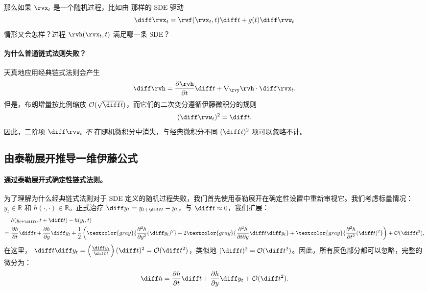 \begin{question}
那么如果 $\rvx_t$ 是一个随机过程，比如由  那样的 SDE 驱动
\[
\diff \rvx_t = \rvf(\rvx_t, t)\diff t + g(t) \diff \rvw_t
\]
情形又会怎样？过程 $\rvh(\rvx_t, t)$ 满足哪一条 SDE？
\end{question}

\paragraph{为什么普通链式法则失败？}
天真地应用经典链式法则会产生
\[
\diff \rvh = \frac{\partial \rvh}{\partial t} \diff t + \nabla_{\rvy}\rvh  \cdot \diff \rvx_t.
\]
但是，布朗增量按比例缩放
$\mathcal{O}(\sqrt{\diff t})$，而它们的二次变分遵循伊藤微积分的规则
\[
(\diff \rvw_t)^2 = \diff t.
\]
因此，二阶项 $\diff \rvw_t$ \textit{不} 在随机微积分中消失，与经典微积分不同 $(\diff t)^2$ 项可以忽略不计。



\subsection{由泰勒展开推导一维伊藤公式}\label{subsec:1D-Ito}

\paragraph{通过泰勒展开式确定性链式法则。}
为了理解为什么经典链式法则对于 SDE 定义的随机过程失败，我们首先使用泰勒展开在确定性设置中重新审视它。我们考虑标量情况： $y_t \in \mathbb{R}$ 和 $h(\cdot,\cdot)\in \mathbb{R}$。正式治疗 $\diff y_t = y_{t+\diff t} - y_t$，与 $\diff t \approx 0$，我们扩展：
\begin{align*}
&h(y_{t+\diff t}, t+\diff t)
- h(y_t, t) \\
= ~&\frac{\partial h}{\partial t} \diff t
+ \frac{\partial h}{\partial y} \diff y_t  + \frac{1}{2} \left(\textcolor{gray}{\frac{\partial^2 h}{\partial y^2}  (\diff y_t)^2}
+ 2 \textcolor{gray}{\frac{\partial^2 h}{\partial t \partial y} \diff t \diff y_t}
+  \textcolor{gray}{\frac{\partial^2 h}{\partial t^2} (\diff t)^2}
\right)
+ \mathcal{O}(\diff t^3),
\end{align*}
在这里， $\diff t \diff y_t = \left(\frac{\diff y_t}{\diff t}\right)(\diff t)^2 = \mathcal{O}(\diff t^2)$，类似地 $(\diff t)^2 = \mathcal{O}(\diff t^2)$。因此，所有灰色部分都可以忽略，完整的微分为：
\[
\diff h
= \frac{\partial h}{\partial t} \diff t
+ \frac{\partial h}{\partial y} \diff y_t
+ \mathcal{O}(\diff t^2).
\]


